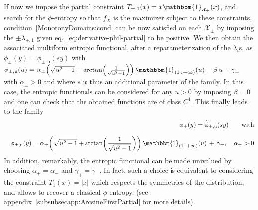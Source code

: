 \documentclass[entropy,article,submit,moreauthors,pdftex]{Definitions/mdpi}
\def\X{\mathcal{X}}%
\def\un{\mathbbm{1}}%
\def\u{\mathrm{u}}
\begin{document}
\begin{Example}\label{arcsineMulti:ex}
  If now  we impose the  partial constraint $T_{\pm,1}(x) =  x \un_{\X_\pm}(x)$,
  and search  for the $\phi$-entropy so  that $f_X$ is the  maximizer subject to
  these constraints,  condition~\ref{MonotonyDomains:cond} can be  now satisfied
  on   each    $\X_\pm$   by   imposing   the    $\pm   \lambda_{\pm,1}$   given
  eq.~\eqref{eq:derivative-phil-partial}  to be  positive.  We  then obtain  the
  associated multiform  entropic functional,  after a reparameterization  of the
  $\lambda_i$s, as  $\phi_\pm(y) = \phi_{\pm,\u}(s y)$  with $\phi_{\pm,\u}(u) =
  \alpha_\pm  \left( \sqrt{u^2  - 1}  + \arctan\left(  \frac{1}{\sqrt{u^2 -  1}}
  \right) \right) \, \un_{(  1 \, ; \, +\infty )}(u) + \beta  \, u + \gamma_\pm$
  with $\alpha_\pm  > 0$ and  where $s$ is thus  an additional parameter  of the
  family.  In this case, the entropic functionals can be considered for any $u >
  0$ by imposing $\beta  = 0$ and one can check that  the obtained functions are
  of class $C^1$. This finally leads to the family
  \begin{eqnarray*}
  && \phi_\pm(y) =  \widetilde{\phi}_{\pm,\u}(s y) \qquad \mbox{with}
  \\[2.5mm]
   && \phi_{\pm,\u}(y) = \alpha_\pm  \left( \sqrt{u^2 -
   1} + \arctan\left( \frac{1}{\sqrt{u^2 - 1}} \right)  \right)
  \, \un_{(  1 \, ;  \, +\infty )}(u) \, + \, \gamma_\pm, \quad \alpha_\pm > 0
   \end{eqnarray*}
  In  addition, remarkably,  the entropic  functional can  be made  univalued by
  choosing $\alpha_+  = \alpha_-$ and  $\gamma_+ =  \gamma_-$.  In fact,  such a
  choice  is equivalent  to  considering  the constraint  $T_1(x)  = |x|$  which
  respects the symmetries of the distribution, and allows to recover a classical
  $\phi$-entropy.  (see appendix~\ref{subsubsecapp:ArcsineFirstPartial} for more
  details).
\end{Example}
\end{document}
